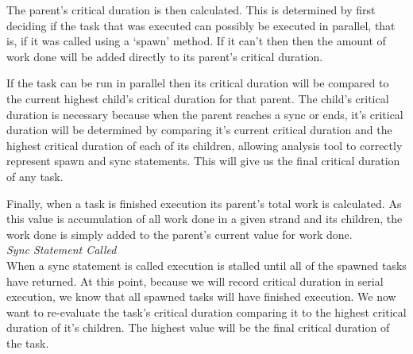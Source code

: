 The parent's critical duration is then calculated. This is determined by first deciding if the task that was executed can possibly be executed in parallel, that is, if it was called using a `spawn' method. If it can't then then the amount of work done will be added directly to its parent's critical duration. 

If the task can be run in parallel then its critical duration will be compared to the current highest child's critical duration for that parent. The child's critical duration is necessary because when the parent reaches a sync or ends, it's critical duration will be determined by comparing it's current critical duration and the highest critical duration of each of its children, allowing analysis tool to correctly represent spawn and sync statements. This will give us the final critical duration of any task.

Finally, when a task is finished execution its parent's total work is calculated. As this value is accumulation of all work done in a given strand and its children, the work done is simply added to the parent's current value for work done.\\

\emph{Sync Statement Called}\\
When a sync statement is called execution is stalled until all of the spawned tasks have returned. At this point, because we will record critical duration in serial execution, we know that all spawned tasks will have finished execution. We now want to re-evaluate the task's critical duration comparing it to the highest critical duration of it's children. The highest value will be the final critical duration of the task.

